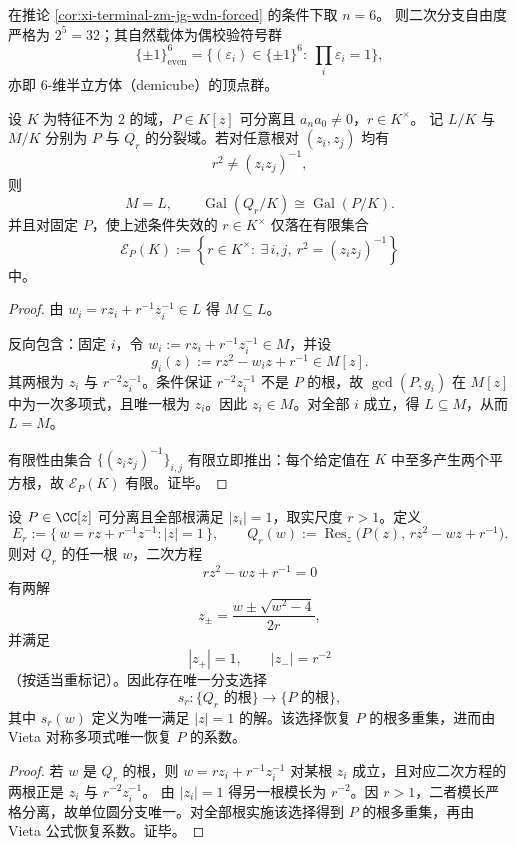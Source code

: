 \begin{corollary}[\texorpdfstring{$n=6$}{n=6} 的半立方体符号微态]\label{cor:xi-terminal-zm-jg-demicube-32}
在推论 \ref{cor:xi-terminal-zm-jg-wdn-forced} 的条件下取 \(n=6\)。
则二次分支自由度严格为 \(2^{5}=32\)；其自然载体为偶校验符号群
\[
\{\pm1\}^6_{\mathrm{even}}=\{(\varepsilon_i)\in\{\pm1\}^6:\ \prod_i\varepsilon_i=1\},
\]
亦即 \(6\)-维半立方体（demicube）的顶点群。
\end{corollary}

\begin{theorem}[代数尺度的有限例外相干性]\label{thm:xi-terminal-zm-jg-algebraic-scale-finite-exception-coherence}
设 \(K\) 为特征不为 \(2\) 的域，\(P\in K[z]\) 可分离且 \(a_n a_0\neq 0\)，\(r\in K^\times\)。
记 \(L/K\) 与 \(M/K\) 分别为 \(P\) 与 \(Q_r\) 的分裂域。若对任意根对 \((z_i,z_j)\) 均有
\[
r^2\neq (z_i z_j)^{-1},
\]
则
\[
M=L,\qquad \operatorname{Gal}(Q_r/K)\cong \operatorname{Gal}(P/K).
\]
并且对固定 \(P\)，使上述条件失效的 \(r\in K^\times\) 仅落在有限集合
\[
\mathcal E_P(K):=
\left\{
r\in K^\times:\ \exists\,i,j,\ r^2=(z_i z_j)^{-1}
\right\}
\]
中。
\end{theorem}
\begin{proof}
由 \(w_i=r z_i+r^{-1}z_i^{-1}\in L\) 得 \(M\subseteq L\)。

反向包含：固定 \(i\)，令 \(w_i:=r z_i+r^{-1}z_i^{-1}\in M\)，并设
\[
g_i(z):=r z^2-w_i z+r^{-1}\in M[z].
\]
其两根为 \(z_i\) 与 \(r^{-2}z_i^{-1}\)。条件保证 \(r^{-2}z_i^{-1}\) 不是 \(P\) 的根，故 \(\gcd(P,g_i)\) 在 \(M[z]\) 中为一次多项式，且唯一根为 \(z_i\)。因此 \(z_i\in M\)。对全部 \(i\) 成立，得 \(L\subseteq M\)，从而 \(L=M\)。

有限性由集合 \(\{(z_i z_j)^{-1}\}_{i,j}\) 有限立即推出：每个给定值在 \(K\) 中至多产生两个平方根，故 \(\mathcal E_P(K)\) 有限。证毕。
\end{proof}

\begin{theorem}\label{thm:xi-terminal-zm-leyang-single-scale-analytic-inversion}
设 \(P\in\CC[z]\) 可分离且全部根满足 \(|z_i|=1\)，取实尺度 \(r>1\)。定义
\[
E_r:=\{\,w=r z+r^{-1}z^{-1}:|z|=1\,\},
\qquad
Q_r(w):=\operatorname{Res}_z\!\bigl(P(z),\,r z^2-w z+r^{-1}\bigr).
\]
则对 \(Q_r\) 的任一根 \(w\)，二次方程
\[
r z^2-w z+r^{-1}=0
\]
有两解
\[
z_\pm=\frac{w\pm\sqrt{w^2-4}}{2r},
\]
并满足
\[
|z_+|=1,\qquad |z_-|=r^{-2}
\]
（按适当重标记）。因此存在唯一分支选择
\[
s_r:\{Q_r\text{ 的根}\}\to \{P\text{ 的根}\},
\]
其中 \(s_r(w)\) 定义为唯一满足 \(|z|=1\) 的解。该选择恢复 \(P\) 的根多重集，进而由 Vieta 对称多项式唯一恢复 \(P\) 的系数。
\end{theorem}
\begin{proof}
若 \(w\) 是 \(Q_r\) 的根，则 \(w=r z_i+r^{-1}z_i^{-1}\) 对某根 \(z_i\) 成立，且对应二次方程的两根正是 \(z_i\) 与 \(r^{-2}z_i^{-1}\)。
由 \(|z_i|=1\) 得另一根模长为 \(r^{-2}\)。因 \(r>1\)，二者模长严格分离，故单位圆分支唯一。对全部根实施该选择得到 \(P\) 的根多重集，再由 Vieta 公式恢复系数。证毕。
\end{proof}

